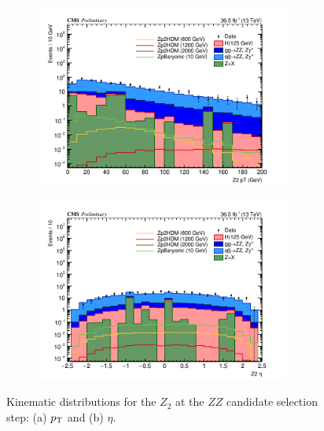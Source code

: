 \begin{enumerate}
\begin{figure}[tbh]
\begin{subfigure}{0.50\textwidth}
\centering
\includegraphics[width=3.3in]{figures/hist_hPtZ2_5.png}
\caption{}
\end{subfigure}
\begin{subfigure}{0.50\textwidth}
\centering
\includegraphics[width=3.3in]{figures/hist_hYZ2_5.png}
\caption{}
\end{subfigure}
\caption{Kinematic distributions for the $Z_2$ at the $ZZ$ candidate selection step: (a) $p_{\rm{T}}$ and (b) $\eta$.}
\label{fig:z25kin}
\end{figure}


\end{enumerate}
